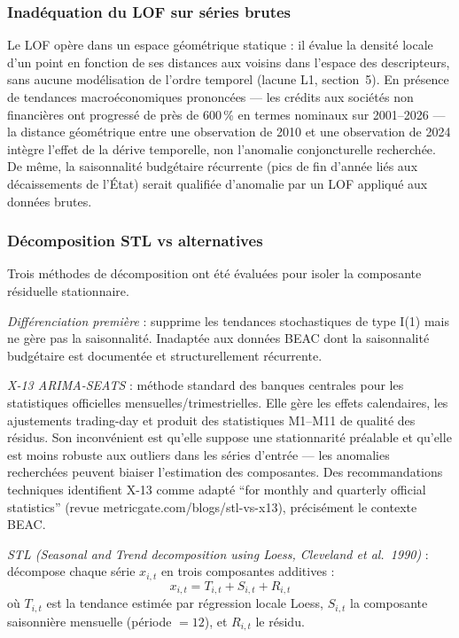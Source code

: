\documentclass[12pt,a4paper]{article}
\begin{document}
\subsubsection{Inadéquation du LOF sur séries brutes}

Le LOF opère dans un espace géométrique statique : il évalue la densité locale
d'un point en fonction de ses distances aux voisins dans l'espace des
descripteurs, sans aucune modélisation de l'ordre temporel (lacune L1,
section~5). En présence de tendances macroéconomiques prononcées --- les
crédits aux sociétés non financières ont progressé de près de 600\,\% en
termes nominaux sur 2001--2026 --- la distance géométrique entre une
observation de 2010 et une observation de 2024 intègre l'effet de la dérive
temporelle, non l'anomalie conjoncturelle recherchée. De même, la saisonnalité
budgétaire récurrente (pics de fin d'année liés aux décaissements de l'État)
serait qualifiée d'anomalie par un LOF appliqué aux données brutes.

\subsubsection{Décomposition STL vs alternatives}

Trois méthodes de décomposition ont été évaluées pour isoler la composante
résiduelle stationnaire.

\textit{Différenciation première} : supprime les tendances stochastiques de
type I(1) mais ne gère pas la saisonnalité. Inadaptée aux données BEAC dont
la saisonnalité budgétaire est documentée et structurellement récurrente.

\textit{X-13 ARIMA-SEATS} : méthode standard des banques centrales pour les
statistiques officielles mensuelles/trimestrielles. Elle gère les effets
calendaires, les ajustements trading-day et produit des statistiques M1--M11
de qualité des résidus. Son inconvénient est qu'elle suppose une stationnarité
préalable et qu'elle est moins robuste aux outliers dans les séries d'entrée
--- les anomalies recherchées peuvent biaiser l'estimation des composantes.
Des recommandations techniques identifient X-13 comme adapté ``for monthly
and quarterly official statistics'' (revue metricgate.com/blogs/stl-vs-x13),
précisément le contexte BEAC.

\textit{STL (Seasonal and Trend decomposition using Loess, Cleveland et al.\
1990)} : décompose chaque série $x_{i,t}$ en trois composantes additives :
$$x_{i,t} = T_{i,t} + S_{i,t} + R_{i,t}$$
où $T_{i,t}$ est la tendance estimée par régression locale Loess, $S_{i,t}$
la composante saisonnière mensuelle (période $= 12$), et $R_{i,t}$ le résidu.
\end{document}
